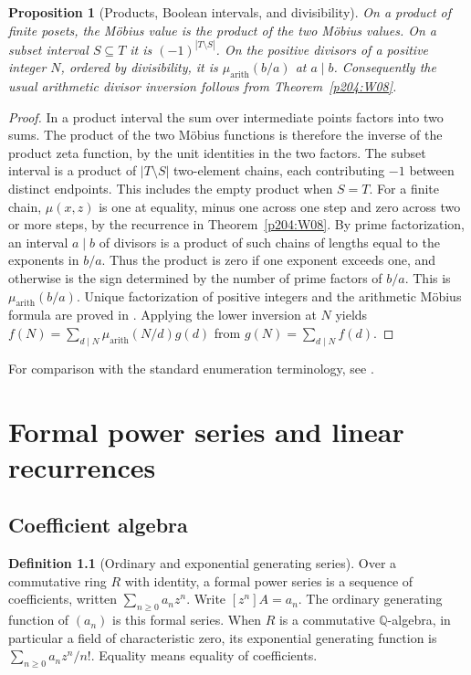 \documentclass[11pt,oneside,openany]{book}
\theoremstyle{plain}
\newtheorem{proposition}[theorem]{Proposition}
\theoremstyle{definition}
\newtheorem{definition}[theorem]{Definition}
\theoremstyle{remark}
\begin{document}
\begin{proposition}[Products, Boolean intervals, and divisibility]
\label{p204:W09}
On a product of finite posets, the Möbius value is the product of
the two Möbius values. On a subset interval \(S\subseteq T\) it is
\((-1)^{|T\setminus S|}\). On the positive divisors of a positive
integer \(N\), ordered by divisibility, it is
\(\mu_{\mathrm{arith}}(b/a)\) at \(a\mid b\). Consequently the usual
arithmetic divisor inversion follows from Theorem~\ref{p204:W08}.
\end{proposition}
\begin{proof}
In a product interval the sum over intermediate points factors into
two sums. The product of the two Möbius functions is therefore the
inverse of the product zeta function, by the unit identities in the
two factors. The subset interval is a product of \(|T\setminus S|\)
two-element chains, each contributing \(-1\) between distinct
endpoints. This includes the empty product when \(S=T\).
For a finite chain, \(\mu(x,z)\) is one at equality, minus one across
one step and zero across two or more steps, by the recurrence in
Theorem~\ref{p204:W08}. By prime factorization, an interval
\(a\mid b\) of divisors is a product of such chains of lengths equal
to the exponents in \(b/a\). Thus the product is zero if one exponent
exceeds one, and otherwise is the sign determined by the number of
prime factors of \(b/a\). This is \(\mu_{\mathrm{arith}}(b/a)\).
Unique factorization of positive integers and the arithmetic
Möbius formula are proved in \cite[Chapters 1 and 3]{P203}.
Applying the lower inversion at \(N\) yields
\(f(N)=\sum_{d\mid N}\mu_{\mathrm{arith}}(N/d)g(d)\) from
\(g(N)=\sum_{d\mid N}f(d)\).
\end{proof}

For comparison with the standard enumeration terminology, see
\cite[Sections 1.1--1.3, 1.7--1.9, 2.1, and 3.3--3.8]{Stanley}.
\chapter[Formal series and recurrences]{Formal power series and linear recurrences}
\label{p204:ch02}

\section{Coefficient algebra}

\begin{definition}[Ordinary and exponential generating series]
\label{p204:W10}
Over a commutative ring \(R\) with identity, a formal power series
is a sequence of coefficients, written \(\sum_{n\ge0}a_nz^n\).
Write \([z^n]A=a_n\). The ordinary generating function of
\((a_n)\) is this formal series. When \(R\) is a commutative
\(\mathbb Q\)-algebra, in particular a field of characteristic zero,
its exponential generating function is \(\sum_{n\ge0}a_nz^n/n!\).
Equality means equality of coefficients.
\end{definition}
\end{document}
